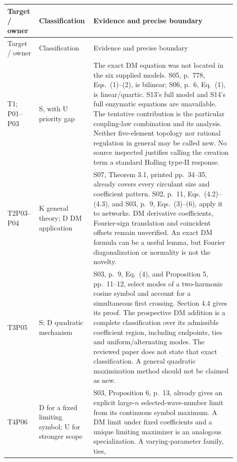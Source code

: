 \begin{longtable}{@{}>{\raggedright\arraybackslash}p{0.12\linewidth}>{\raggedright\arraybackslash}p{0.20\linewidth}>{\raggedright\arraybackslash}p{0.60\linewidth}@{}}
\toprule
Target / owner & Classification & Evidence and precise boundary\\
\midrule
\endfirsthead
\toprule
Target / owner & Classification & Evidence and precise boundary\\
\midrule
\endhead
\bottomrule
\endfoot
T1\newline 00; P01--P03 & S, with U priority gap &
The exact DM equation was not located in the six supplied models.
S05, p.~778, Eqs.~(1)--(2), is bilinear; S06, p.~6, Eq.~(1), is
linear/quartic. S13's full model and S14's full enzymatic equations are
unavailable. The tentative contribution is the particular coupling-law
combination and its analysis. Neither five-element topology nor rational
regulation in general may be called new. No source inspected justifies
calling the creation term a standard Holling type-II response.\\[5pt]
T2\newline P03--P04 & K general theory; D DM application &
S07, Theorem 3.1, printed pp.~34--35, already covers every circulant
size and coefficient pattern. S02, p.~11, Eqs.~(4.2)--(4.3), and S03,
p.~9, Eqs.~(3)--(6), apply it to networks. DM derivative coefficients,
Fourier-sign translation and coincident offsets remain unverified.
An exact DM formula can be a useful lemma, but Fourier diagonalization
or normality is not the novelty.\\[5pt]
T3\newline P05 & S; D quadratic mechanism &
S03, p.~9, Eq.~(4), and Proposition 5, pp.~11--12, select modes of
a two-harmonic cosine symbol and account for a simultaneous first
crossing. Section 4.4 gives its proof. The prospective DM addition is
a complete classification over its admissible coefficient region,
including endpoints, ties and uniform/alternating modes. The reviewed
paper does not state that exact classification. A general quadratic
maximization method should not be claimed as new.\\[5pt]
T4\newline P06 & D for a fixed limiting symbol; U for stronger scope &
S03, Proposition 6, p.~13, already gives an explicit large-$n$
selected-wave-number limit from its continuous symbol maximum.
A DM limit under fixed coefficients and a unique limiting maximizer
is an analogous specialization. A varying-parameter family, ties,

\end{longtable}
